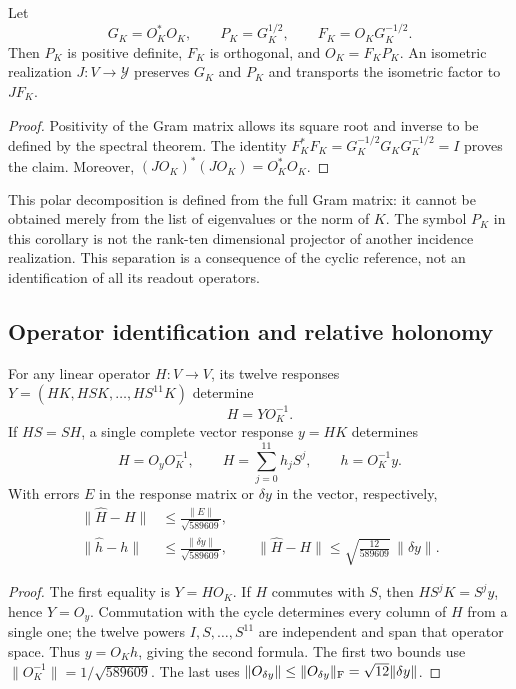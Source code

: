 \begin{corollary}
\label{md:antmem:k:polar}
Let
\[
 G_K=O_K^*O_K,\qquad P_K=G_K^{1/2},\qquad
 F_K=O_KG_K^{-1/2}.
\]
Then \(P_K\) is positive definite, \(F_K\) is orthogonal, and
\(O_K=F_KP_K\). An isometric realization \(J:V\to\mathcal Y\)
preserves \(G_K\) and \(P_K\) and transports the isometric factor to
\(JF_K\).
\end{corollary}
\begin{proof}
Positivity of the Gram matrix allows its square root and inverse to be defined by the
spectral theorem. The identity
\(F_K^*F_K=G_K^{-1/2}G_KG_K^{-1/2}=I\) proves the claim.
Moreover, \((JO_K)^*(JO_K)=O_K^*O_K\).
\end{proof}

This polar decomposition is defined from the full Gram matrix: it cannot be obtained merely from
the list of eigenvalues or the norm of \(K\). The symbol
\(P_K\) in this corollary is not the rank-ten dimensional projector
of another incidence realization. This separation is a consequence of the
cyclic reference, not an identification of all its readout operators.

\subsection{Operator identification and relative holonomy}
\label{md:antmem:k:identificacion}

\begin{theorem}
\label{md:antmem:k:operadores}
For any linear operator \(H:V\to V\), its twelve responses
\(Y=(HK,HSK,\ldots,HS^{11}K)\) determine
\[
 H=YO_K^{-1}.
\]
If \(HS=SH\), a single complete vector response \(y=HK\)
determines
\begin{equation}
 H=O_yO_K^{-1},\qquad
 H=\sum_{j=0}^{11}h_jS^j,\qquad h=O_K^{-1}y.
 \label{md:antmem:k:filtro}
\end{equation}
With errors \(E\) in the response matrix or \(\delta y\) in the
vector, respectively,
\begin{align}
 \|\widehat H-H\|&\leq\frac{\|E\|}{\sqrt{589609}},
 \label{md:antmem:k:error-matriz}\\
 \|\widehat h-h\|&\leq\frac{\|\delta y\|}{\sqrt{589609}},\qquad
 \|\widehat H-H\|\leq\sqrt{\frac{12}{589609}}\,\|\delta y\|.
 \label{md:antmem:k:error-filtro}
\end{align}
\end{theorem}
\begin{proof}
The first equality is \(Y=HO_K\). If \(H\) commutes with \(S\),
then \(HS^jK=S^jy\), hence \(Y=O_y\). Commutation with
the cycle determines every column of \(H\) from a single one;
the twelve powers \(I,S,\ldots,S^{11}\) are independent and span
that operator space. Thus \(y=O_Kh\), giving the
second formula. The first two bounds use
\(\|O_K^{-1}\|=1/\sqrt{589609}\). The last uses
\(\|O_{\delta y}\|\leq\|O_{\delta y}\|_{\rm F}
=\sqrt{12}\|\delta y\|\).
\end{proof}

